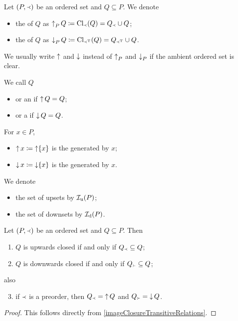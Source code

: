 \begin{definition}
Let $\sSet{P, \Yleft}$ be an ordered set and $Q\subseteq P$. We denote
\begin{itemize}
\item the  of $Q$ as $\operatorname{\uparrow}_P Q \coloneqq \operatorname{Cl}_{\Yleft}(Q) = Q_{\Yleft} \cup Q$;
\item the  of $Q$ as $\operatorname{\downarrow}_P Q \coloneqq \operatorname{Cl}_{\Yleft^{\mathrm{T}}}(Q) = Q_{\Yleft^{\mathrm{T}}} \cup Q$.
\end{itemize}
We usually write $\operatorname{\uparrow}$ and $\operatorname{\downarrow}$ instead of $\operatorname{\uparrow}_P$ and $\operatorname{\downarrow}_P$ if the ambient ordered set is clear.

We call $Q$
\begin{itemize}
\item {} or an  if $\operatorname{\uparrow} Q = Q$;
\item {} or a  if $\operatorname{\downarrow} Q = Q$.
\end{itemize}
For $x\in P$,
\begin{itemize}
\item $\operatorname{\uparrow} x \coloneqq \operatorname{\uparrow}\{x\}$ is the  generated by $x$;
\item $\operatorname{\downarrow} x \coloneqq \operatorname{\downarrow}\{x\}$ is the  generated by $x$.
\end{itemize}
We denote
\begin{itemize}
\item the set of upsets by $\operatorname{\mathcal{I}_u}(P)$;
\item the set of downsets by $\operatorname{\mathcal{I}_d}(P)$.
\end{itemize}
\end{definition}

\begin{lemma} \label{upwardDownwardClosure}
Let $\sSet{P, \Yleft}$ be an ordered set and $Q\subseteq P$. Then
\begin{enumerate}
\item $Q$ is upwards closed \textup{if and only if} $Q_\Yleft \subseteq Q$;
\item $Q$ is downwards closed \textup{if and only if} $Q_{\Yright} \subseteq Q$;
\end{enumerate}
also
\begin{enumerate} \setcounter{enumi}{2}
\item if $\Yleft$ is a preorder, then $Q_\Yleft = \operatorname{\uparrow} Q$ and $Q_{\Yright} = \operatorname{\downarrow} Q$.
\end{enumerate}
\end{lemma}
\begin{proof}
This follows directly from \ref{imageClosureTransitiveRelations}.
\end{proof}


